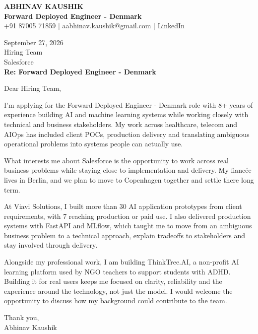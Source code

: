 \documentclass[10pt,a4paper]{article}
\begin{document}
\begin{center}
{\Large\bfseries ABHINAV KAUSHIK}\\[2pt]
{\bfseries Forward Deployed Engineer - Denmark}\\[2pt]
+91 87005 71859 \quad | \quad aabhinav.kaushik@gmail.com \quad | \quad LinkedIn
\end{center}
\vspace{8pt}
September 27, 2026\\[6pt]
Hiring Team\\
Salesforce\\[4pt]
\textbf{Re: Forward Deployed Engineer - Denmark}

Dear Hiring Team,

I’m applying for the Forward Deployed Engineer - Denmark role with 8+ years of experience building AI and machine learning systems while working closely with technical and business stakeholders. My work across healthcare, telecom and AIOps has included client POCs, production delivery and translating ambiguous operational problems into systems people can actually use.

What interests me about Salesforce is the opportunity to work across real business problems while staying close to implementation and delivery. My fiancée lives in Berlin, and we plan to move to Copenhagen together and settle there long term.

At Viavi Solutions, I built more than 30 AI application prototypes from client requirements, with 7 reaching production or paid use. I also delivered production systems with FastAPI and MLflow, which taught me to move from an ambiguous business problem to a technical approach, explain tradeoffs to stakeholders and stay involved through delivery.

Alongside my professional work, I am building ThinkTree.AI, a non-profit AI learning platform used by NGO teachers to support students with ADHD. Building it for real users keeps me focused on clarity, reliability and the experience around the technology, not just the model. I would welcome the opportunity to discuss how my background could contribute to the team.

Thank you,\\
Abhinav Kaushik
\end{document}
